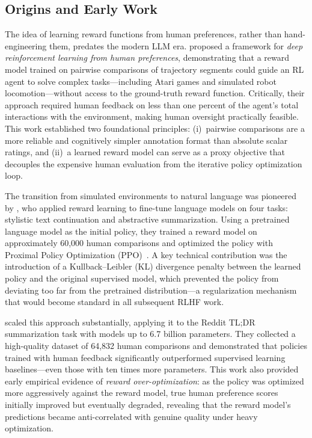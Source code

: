 \documentclass[12pt,a4paper]{report}
\theoremstyle{definition}
\begin{document}
\subsection{Origins and Early Work}

The idea of learning reward functions from human preferences, rather than hand-engineering them, predates the modern LLM era. \cite{christiano2017deep} proposed a framework for \emph{deep reinforcement learning from human preferences}, demonstrating that a reward model trained on pairwise comparisons of trajectory segments could guide an RL agent to solve complex tasks---including Atari games and simulated robot locomotion---without access to the ground-truth reward function. Critically, their approach required human feedback on less than one percent of the agent's total interactions with the environment, making human oversight practically feasible. This work established two foundational principles: (i)~pairwise comparisons are a more reliable and cognitively simpler annotation format than absolute scalar ratings, and (ii)~a learned reward model can serve as a proxy objective that decouples the expensive human evaluation from the iterative policy optimization loop.

The transition from simulated environments to natural language was pioneered by \cite{ziegler2019finetuning}, who applied reward learning to fine-tune language models on four tasks: stylistic text continuation and abstractive summarization. Using a pretrained language model as the initial policy, they trained a reward model on approximately 60,000 human comparisons and optimized the policy with Proximal Policy Optimization (PPO)~\cite{schulman2017ppo}. A key technical contribution was the introduction of a Kullback--Leibler (KL) divergence penalty between the learned policy and the original supervised model, which prevented the policy from deviating too far from the pretrained distribution---a regularization mechanism that would become standard in all subsequent RLHF work.

\cite{stiennon2020learning} scaled this approach substantially, applying it to the Reddit TL;DR summarization task with models up to 6.7 billion parameters. They collected a high-quality dataset of 64,832 human comparisons and demonstrated that policies trained with human feedback significantly outperformed supervised learning baselines---even those with ten times more parameters. This work also provided early empirical evidence of \emph{reward over-optimization}: as the policy was optimized more aggressively against the reward model, true human preference scores initially improved but eventually degraded, revealing that the reward model's predictions became anti-correlated with genuine quality under heavy optimization.
\end{document}
